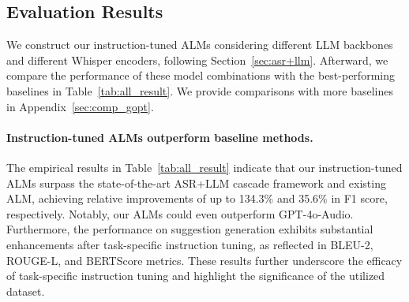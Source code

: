 \documentclass[11pt]{article}
\begin{document}


\subsection{Evaluation Results}

We construct our instruction-tuned ALMs considering different LLM backbones and different Whisper encoders, following Section~\ref{sec:asr+llm}. Afterward, we compare the performance of these model combinations with the best-performing baselines in Table~\ref{tab:all_result}. We provide comparisons with more baselines in Appendix~\ref{sec:comp_gopt}.

\paragraph{Instruction-tuned ALMs outperform baseline methods.} The empirical results in Table~\ref{tab:all_result} indicate that our instruction-tuned ALMs surpass the state-of-the-art ASR+LLM cascade framework and existing ALM, achieving relative improvements of up to 134.3\% and 35.6\% in F1 score, respectively. Notably, our ALMs could even outperform GPT-4o-Audio. Furthermore, the performance on suggestion generation exhibits substantial enhancements after task-specific instruction tuning, as reflected in BLEU-2, ROUGE-L, and BERTScore metrics. These results further underscore the efficacy of task-specific instruction tuning and highlight the significance of the utilized dataset.
\end{document}
